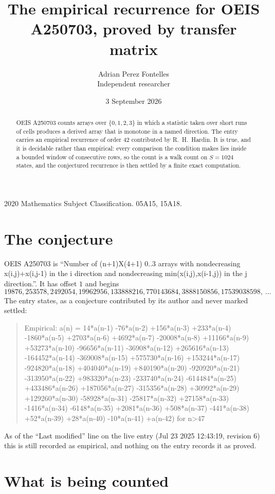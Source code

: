\documentclass[11pt,a4paper]{article}
\title{The empirical recurrence for OEIS A250703, proved by transfer matrix}
\author{Adrian Perez Fontelles\\ \small Independent researcher}
\date{3 September 2026}
\theoremstyle{plain}
\theoremstyle{definition}
\begin{document}
\maketitle

\begin{abstract}
OEIS A250703 counts arrays over $\{0,1,2,3\}$ in which a statistic taken over short runs
of cells produces a derived array that is monotone in a named direction. The entry carries an
empirical recurrence of order $42$ contributed by R.~H.~Hardin. It is true, and it is
decidable rather than empirical: every comparison the condition makes lies inside a bounded
window of consecutive rows, so the count is a walk count on $S=1024$ states, and the
conjectured recurrence is then settled by a finite exact computation.
\end{abstract}

\noindent\small 2020 Mathematics Subject Classification. 05A15, 15A18.\normalsize

\section{The conjecture}

OEIS A250703 is ``Number of (n+1)X(4+1) 0..3 arrays with nondecreasing x(i,j)+x(i,j-1) in the i direction and nondecreasing min(x(i,j),x(i-1,j)) in the j direction.''. It has offset $1$ and begins
\[
19876, 253578, 2492054, 19962956, 133888216, 770143684, 3888150856, 17539038598,\ \dots
\]
The entry states, as a conjecture contributed by its author and never marked settled:
\begin{quote}
Empirical: a(n) = 14*a(n-1) -76*a(n-2) +156*a(n-3) +233*a(n-4) -1860*a(n-5) +2703*a(n-6) +4692*a(n-7) -20008*a(n-8) +11166*a(n-9) +53273*a(n-10) -96656*a(n-11) -36908*a(n-12) +265616*a(n-13) -164452*a(n-14) -369008*a(n-15) +575730*a(n-16) +153244*a(n-17) -924820*a(n-18) +404040*a(n-19) +840190*a(n-20) -920920*a(n-21) -313950*a(n-22) +983320*a(n-23) -233740*a(n-24) -614484*a(n-25) +433486*a(n-26) +187056*a(n-27) -315356*a(n-28) +30992*a(n-29) +129260*a(n-30) -58928*a(n-31) -25817*a(n-32) +27158*a(n-33) -1416*a(n-34) -6148*a(n-35) +2081*a(n-36) +508*a(n-37) -441*a(n-38) +52*a(n-39) +28*a(n-40) -10*a(n-41) +a(n-42) for n>47
\end{quote}
As of the ``Last modified'' line on the live entry (Jul 23 2025 12:43:19, revision 6) this is still
recorded as empirical, and nothing on the entry records it as proved.

\section{What is being counted}
\end{document}
